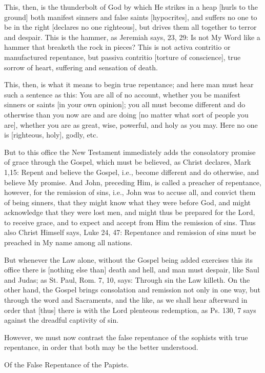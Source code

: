 This, then, is the thunderbolt of God by which He strikes in a
heap [hurls to the ground] both manifest sinners and false
saints [hypocrites], and suffers no one to be in the right
[declares no one righteous], but drives them all together to
terror and despair. This is the hammer, as Jeremiah says, 23,
29: Is not My Word like a hammer that breaketh the rock in
pieces? This is not activa contritio or manufactured
repentance, but passiva contritio [torture of conscience],
true sorrow of heart, suffering and sensation of death.

This, then, is what it means to begin true repentance; and
here man must hear such a sentence as this: You are all of no
account, whether you be manifest sinners or saints [in your
own opinion]; you all must become different and do otherwise
than you now are and are doing [no matter what sort of people
you are], whether you are as great, wise, powerful, and holy
as you may. Here no one is [righteous, holy], godly, etc.

But to this office the New Testament immediately adds the
consolatory promise of grace through the Gospel, which must be
believed, as Christ declares, Mark 1,15: Repent and believe
the Gospel, i.e., become different and do otherwise, and
believe My promise. And John, preceding Him, is called a
preacher of repentance, however, for the remission of sins,
i.e., John was to accuse all, and convict them of being
sinners, that they might know what they were before God, and
might acknowledge that they were lost men, and might thus be
prepared for the Lord, to receive grace, and to expect and
accept from Him the remission of sins. Thus also Christ
Himself says, Luke 24, 47: Repentance and remission of sins
must be preached in My name among all nations.

But whenever the Law alone, without the Gospel being added
exercises this its office there is [nothing else than] death
and hell, and man must despair, like Saul and Judas; as St.
Paul, Rom. 7, 10, says: Through sin the Law killeth. On the
other hand, the Gospel brings consolation and remission not
only in one way, but through the word and Sacraments, and the
like, as we shall hear afterward in order that [thus] there is
with the Lord plenteous redemption, as Ps. 130, 7 says against
the dreadful captivity of sin.

However, we must now contrast the false repentance of the
sophists with true repentance, in order that both may be the
better understood.

Of the False Repentance of the Papists.

